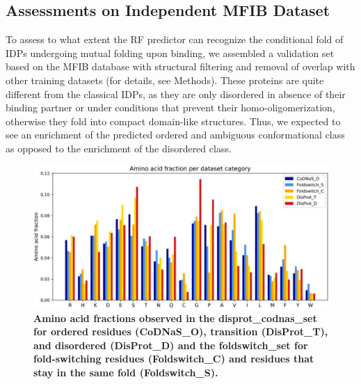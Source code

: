\subsection{Assessments on Independent MFIB Dataset}

To assess to what extent the RF predictor can recognize the conditional fold of IDPs undergoing mutual folding upon binding, we assembled a validation set based on the MFIB database \cite{ficho_mfib_2017} with structural filtering and removal of overlap with other training datasets (for details, see Methods). These proteins are quite different from the classical IDPs, as they are only disordered in absence of their binding partner or under conditions that prevent their homo-oligomerization, otherwise they fold into compact domain-like structures. Thus, we expected to see an enrichment of the predicted ordered and ambiguous conformational class as opposed to the enrichment of the disordered class.

\begin{figure}[tbh]
    \centering
    \includegraphics[width=\linewidth]{ambiguous//figures_ambiguous/fig3.pdf}
    \caption{\textbf{Amino acid fractions observed in the disprot_codnas_set for ordered residues (CoDNaS_O), transition (DisProt_T), and disordered (DisProt_D) and the foldswitch_set for fold-switching residues (Foldswitch_C) and residues that stay in the same fold (Foldswitch_S).}}
    \label{fig:chapter5:fig3}
\end{figure}

